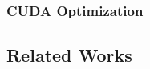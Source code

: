 \subsubsection{CUDA Optimization}\label{gpu:ssec:cop}
\subsection{Related Works}\label{gpu:sec:rel}
